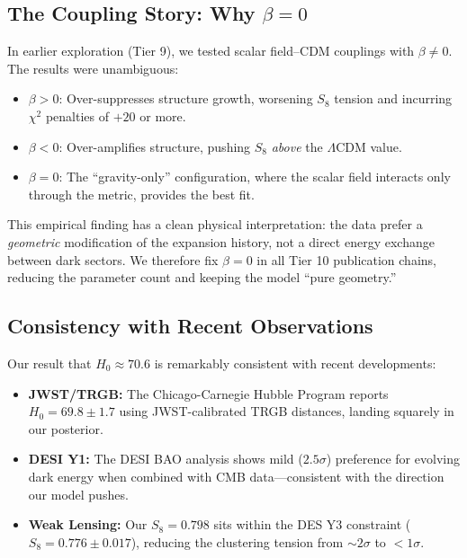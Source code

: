 \subsection{The Coupling Story: Why $\beta = 0$}

In earlier exploration (Tier 9), we tested scalar field--CDM couplings with $\beta \neq 0$. The results were unambiguous:
\begin{itemize}
    \item $\beta > 0$: Over-suppresses structure growth, worsening $S_8$ tension and incurring $\chi^2$ penalties of $+20$ or more.
    \item $\beta < 0$: Over-amplifies structure, pushing $S_8$ \emph{above} the $\Lambda$CDM value.
    \item $\beta = 0$: The ``gravity-only'' configuration, where the scalar field interacts only through the metric, provides the best fit.
\end{itemize}

This empirical finding has a clean physical interpretation: the data prefer a \emph{geometric} modification of the expansion history, not a direct energy exchange between dark sectors. We therefore fix $\beta = 0$ in all Tier 10 publication chains, reducing the parameter count and keeping the model ``pure geometry.''

\subsection{Consistency with Recent Observations}

Our result that $H_0 \approx 70.6$ is remarkably consistent with recent developments:

\begin{itemize}
    \item \textbf{JWST/TRGB:} The Chicago-Carnegie Hubble Program reports $H_0 = 69.8 \pm 1.7$ using JWST-calibrated TRGB distances, landing squarely in our posterior.
    
    \item \textbf{DESI Y1:} The DESI BAO analysis shows mild ($2.5\sigma$) preference for evolving dark energy when combined with CMB data---consistent with the direction our model pushes.
    
    \item \textbf{Weak Lensing:} Our $S_8 = 0.798$ sits within the DES Y3 constraint ($S_8 = 0.776 \pm 0.017$), reducing the clustering tension from $\sim 2\sigma$ to $< 1\sigma$.
\end{itemize}

